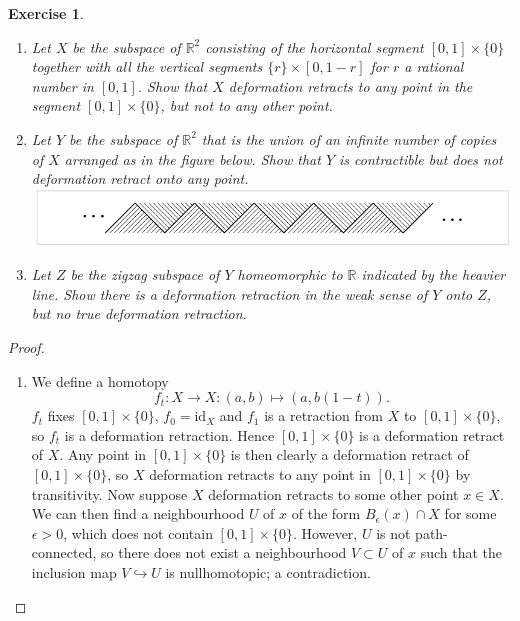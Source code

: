 \documentclass{article}
\newtheorem{exercise}[theorem]{Exercise}
\begin{document}
\begin{exercise}
\begin{enumerate}
\item[(a)] Let $X$ be the subspace of $\mathbb{R}^2$ consisting of the horizontal segment $[0,1]\times\{0\}$ together with all the vertical segments $\{r\}\times[0,1-r]$ for $r$ a rational number in $[0,1]$. Show that $X$ deformation retracts to any point in the segment $[0,1]\times\{0\}$, but not to any other point.
\item[(b)] Let $Y$ be the subspace of $\mathbb{R}^2$ that is the union of an infinite number of copies of $X$ arranged as in the figure below. Show that $Y$ is contractible but does not deformation retract onto any point.
\includegraphics[scale=0.5]{Screenshot 2025-07-20 at 19-46-35 AT.dvi - AT.pdf.png}
\item[(c)] Let $Z$ be the zigzag subspace of $Y$ homeomorphic to $\mathbb{R}$ indicated by the heavier line. Show there is a deformation retraction in the weak sense of $Y$ onto $Z$, but no true deformation retraction.
\end{enumerate}
\end{exercise}
\begin{proof}
\begin{enumerate}
\item[(a)] We define a homotopy \[f_t:X\to X:(a,b) \mapsto (a,b(1-t)).\] $f_t$ fixes $[0,1]\times\{0\}$, $f_0=\text{id}_X$ and $f_1$ is a retraction from $X$ to $[0,1]\times\{0\}$, so $f_t$ is a deformation retraction. Hence $[0,1]\times\{0\}$ is a deformation retract of $X$. Any point in $[0,1]\times\{0\}$ is then clearly a deformation retract of $[0,1]\times\{0\}$, so  $X$ deformation retracts to any point in $[0,1]\times\{0\}$ by transitivity. Now suppose $X$ deformation retracts to some other point $x\in X$. We can then find a neighbourhood $U$ of $x$ of the form $B_\epsilon(x)\cap X$ for some $\epsilon > 0$, which does not contain $[0,1]\times\{0\}$. However, $U$ is not path-connected, so there does not exist a neighbourhood $V\subset U$ of $x$ such that the inclusion map $V\hookrightarrow U$ is nullhomotopic; a contradiction.
\end{enumerate}
\end{proof}
\end{document}
